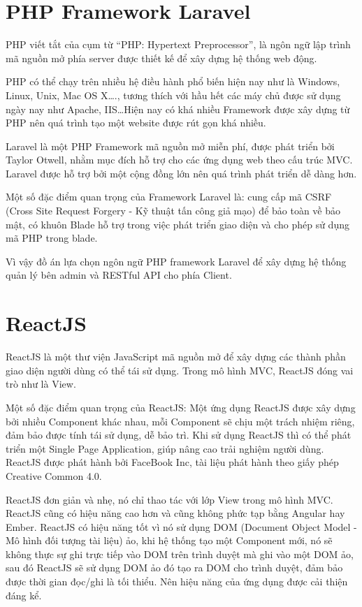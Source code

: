 \documentclass[../DoAn.tex]{subfiles}
\begin{document}
\section{PHP Framework Laravel}
\label{section:3.1}
PHP viết tắt của cụm từ “PHP: Hypertext Preprocessor”, là ngôn ngữ lập trình mã nguồn mở phía server được thiết kế để xây dựng hệ thống web động\cite{PHP}.

PHP có thể chạy trên nhiều hệ điều hành phổ biến hiện nay như là Windows, Linux, Unix, Mac OS X…., tương thích với hầu hết các máy chủ được sử dụng ngày nay như Apache, IIS…Hiện nay có khá nhiều Framework được xây dựng từ PHP nên quá trình tạo một website được rút gọn khá nhiều. 

Laravel là một PHP Framework mã nguồn mở miễn phí, được phát triển bởi Taylor Otwell, nhằm mục đích hỗ trợ cho các ứng dụng web theo cấu trúc MVC\cite{Laravel}. Laravel được hỗ trợ bởi một cộng đồng lớn nên quá trình phát triển dễ dàng hơn. 

Một số đặc điểm quan trọng của Framework Laravel là: cung cấp mã CSRF (Cross Site
Request Forgery - Kỹ thuật tấn công giả mạo) để bảo toàn về bảo mật, có khuôn Blade hỗ trợ trong việc phát triển giao diện và cho phép sử dụng mã PHP trong blade.

Vì vậy đồ án lựa chọn ngôn ngữ PHP framework Laravel để xây dựng hệ thống quản lý bên admin và RESTful API cho phía Client. 
\section{ReactJS}
\label{section:3.2}
ReactJS là một thư viện JavaScript mã nguồn mở để xây dựng các thành phần giao diện người dùng có thể tái sử dụng\cite{ReactJS}. Trong mô hình MVC, ReactJS đóng vai trò như là View.

Một số đặc điểm quan trọng của ReactJS: Một ứng dụng ReactJS được xây dựng bởi nhiều Component khác nhau, mỗi Component sẽ chịu một trách nhiệm riêng, đảm bảo được tính tái sử dụng, dễ bảo trì. Khi sử dụng ReactJS thì có thể phát triển một Single Page Application, giúp nâng cao trải nghiệm người dùng. ReactJS được phát hành bởi FaceBook Inc, tài liệu phát hành theo giấy phép Creative Common 4.0.

ReactJS đơn giản và nhẹ, nó chỉ thao tác với lớp View trong mô hình MVC. ReactJS cũng có hiệu năng cao hơn và cũng không phức tạp bằng Angular hay Ember. ReactJS có hiệu năng tốt vì nó sử dụng DOM (Document Object Model - Mô hình đối tượng tài liệu) ảo, khi hệ thống tạo một Component mới, nó sẽ không thực sự ghi trực tiếp vào DOM trên trình duyệt mà ghi vào một DOM ảo, sau đó ReactJS sẽ sử dụng DOM ảo đó tạo ra DOM cho trình duyệt, đảm bảo được thời gian đọc/ghi là tối thiểu\cite{ReactJSDOM}. Nên hiệu năng của ứng dụng được cải thiện đáng kể. 
\end{document}
